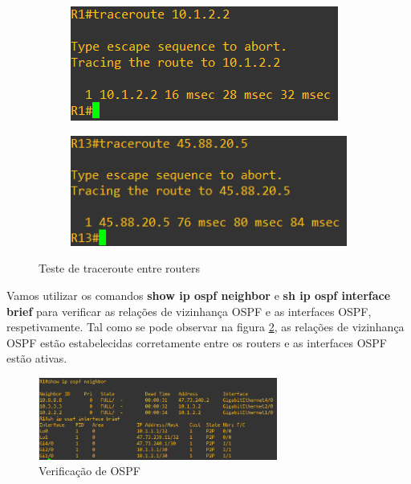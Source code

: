 \documentclass[11pt,english, openright, oneside]{book}
\begin{document}
\begin{figure}[H]
  \centering
  \begin{subfigure}{.5\textwidth}
      \centering
      \includegraphics[width=0.94\linewidth]{imagens/Tarefa1/2.tracerouteR1_R2.png}
  \end{subfigure}%
  \begin{subfigure}{.5\textwidth}
      \centering
      \includegraphics[width=1\linewidth]{imagens/Tarefa1/2.tracerouteR13_R11.png}
  \end{subfigure}
  \caption{Teste de traceroute entre routers}
  \label{fig:testeTraceroute}
\end{figure}
\vspace{0.2cm}

Vamos utilizar os comandos \textbf{show ip ospf neighbor} e \textbf{sh ip ospf interface brief} para verificar as relações de vizinhança OSPF e as interfaces OSPF, respetivamente. Tal como se pode observar na figura \ref{fig:showOspf}, as relações de vizinhança OSPF estão estabelecidas corretamente entre os routers e as interfaces OSPF estão ativas.
\vspace{0.2cm}

\begin{figure}[H]
  \centering
  \includegraphics[width=0.70\textwidth]{imagens/Tarefa1/2.showOspf.png}
  \caption{Verificação de OSPF}
  \label{fig:showOspf}
\end{figure}
\vspace{0.2cm}
\end{document}
